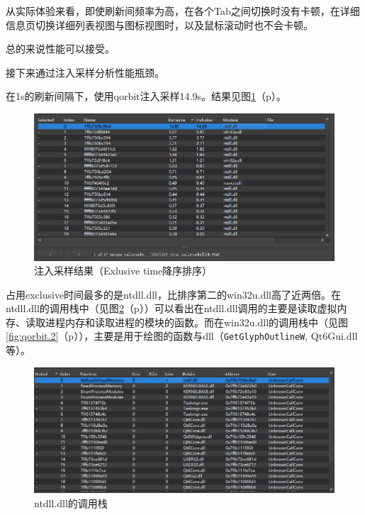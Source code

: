 \documentclass{beamer}
\newcommand\code[1]{\texttt{#1}}
\newcommand\myref[1]{\ref{#1}（p\pageref{#1}）}
\begin{document}
\begin{frame}
    从实际体验来看，即使刷新间频率为高，在各个Tab之间切换时没有卡顿，在详细信息页切换详细列表视图与图标视图时，以及鼠标滚动时也不会卡顿。

总的来说性能可以接受。
\end{frame}

\begin{frame}
    
接下来通过注入采样分析性能瓶颈。

在1s的刷新间隔下，使用qorbit注入采样14.9s。结果见图\myref{fig:qorbit}。

\begin{figure}
    \centering
    \includegraphics[scale=0.44]{../media/performance analyze/14.878s sampling result.png}
    \caption{注入采样结果（Exlusive time降序排序）}
    \label{fig:qorbit}
\end{figure}
\end{frame}

\begin{frame}
    占用exclusive时间最多的是ntdll.dll，比排序第二的win32u.dll高了近两倍。在ntdll.dll的调用栈中（见图\myref{fig:qorbit.1}）可以看出在ntdll.dll调用的主要是读取虚拟内存、读取进程内存和读取进程的模块的函数。而在win32u.dll的调用栈中（见图\myref{fig:qorbit.2}），主要是用于绘图的函数与dll（\code{GetGlyphOutlineW}, Qt6Gui.dll等）。
\end{frame}

\begin{frame}
    \begin{figure}
        \centering
        \includegraphics[scale=0.46]{../media/performance analyze/14.878s sampling result 1 callstuck.png}
        \caption{ntdll.dll的调用栈}
        \label{fig:qorbit.1}
    \end{figure}
\end{frame}
\end{document}
